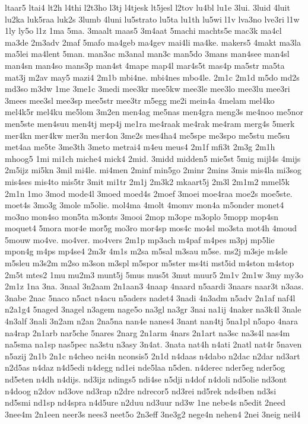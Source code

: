 {ltaar5
ltai4
lt2h
l4thi
l2t3ho
l3tj
l4tjesk
lt5jesl
l2tov
lu4bl
lu1e
3lui.
3luid
4luit
lu2ka
luk5raa
luk2s
3lumb
4luni
lu5strato
lu5ta
lu1th
lu5wi
l1v
lva3no
lve3ri
l1w
1ly
ly5o
l1z
1ma
5ma.
3maalt
maas5
3m4aat
5machi
machts5e
mac3k
ma4cl
ma3de
2m3adv
2maf
5mafo
ma4geb
ma4gev
mai4li
ma4ke.
makers5
4makt
ma3la
ma5lei
ma4lent
5man.
man3ac
m3anal
man3c
man5do
3mans
man4see
man4sl
man4sn
man4so
mans3p
man4st
4mape
map4l
mar4s5t
mas4p
ma5str
ma5ta
mat3j
m2av
may5
mazi4
2m1b
mbi4ne.
mbi4nes
mbo4le.
2m1c
2m1d
m5do
md2s
md3so
m3dw
1me
3me1c
3medi
mee3kr
mee5kw
mee3le
mee3lo
mee3lu
mee3ri
3mees
mee3sl
mee3sp
mee5str
mee3tr
m5egg
me2i
mein4a
4melam
mel4ko
mel4k5r
mel4ku
me5lom
3m2en
men4ag
me5nas
men4gra
meng3s
me4noo
me5nor
men5ste
men4suu
men4tj
mep4j
me1ra
me4raak
me4rak
me4ram
merg4s
5merk
mer4kn
mer4kw
mer3n
mer4on
3me2s
mes4ha4
me5spe
me3spo
me5stu
me5su
met4aa
me5te
3me3th
3meto
metrai4
m4eu
meus4
2m1f
mfi3t
2m3g
2m1h
mhoog5
1mi
mi1ch
miche4
mick4
2mid.
3midd
midden5
mie5st
5mig
mijl4s
4mijs
2m5ijz
mi5kn
3mil
mi4le.
mi4men
2minf
min5go
2minr
2mins
3mis
mis4la
mi3sog
mis4ses
mis4to
mis5tr
3mit
mi1tr
2m1j
2m3k2
mkaart5j
2m3l
2m1m2
mmel5k
2m1n
1mo
3mod
mode4l
3moed
moed4s
2moef
3moei
moe4raa
moe2s
moe5ste.
moet4s
3mo3g
3mole
m5olie.
mol4ma
4molt
4momv
mon4a
m5onder
monet4
mo3no
mon4so
mon5ta
m3onts
3mooi
2mop
m3ope
m3oplo
5mopp
mop4sn
moquet4
5mora
mor4e
mor5g
mo3ro
mor4sp
mos4c
mo4sl
mo3sta
mot4h
4moud
5mouw
mo4ve.
mo4ver.
mo4vers
2m1p
mp3ach
m4paf
m4pes
m3pj
mp5lie
mpon4g
m4ps
mp4se4
2m3r
4m1s
m2sa
m5sal
m3sau
m5se.
ms2j
m3sje
m4sle
m5sleu
m3s2m
m2so
m3son
m3spl
m5spor
m5ster
ms4ti
mst5id
m4ston
m4stop
2m5t
mtes2
1mu
mu2m3
munt5j
5mus
mus5t
3mut
muur5
2m1v
2m1w
3my
my3o
2m1z
1na
3na.
3naal
3n2aam
2n1aan3
4naap
4naard
n5aardi
3naars
naar3t
n3aas.
3nabe
2nac
5naco
n5act
n4acu
n5aders
nadet4
3nadi
4n3adm
n5adv
2n1af
naf4l
n2a1g4
5naged
3nagel
n3agem
nage5o
na3gl
na3gr
3nai
na1ij
4naker
na3k4l
3nale
4n3alf
3nali
3n2am
n2an
2na5na
nan4e
nanes4
3nant
nan4tj
5na1pl
n5apo
4nara
na4rap
2n1arb
nar5che
5nares
2narg
2n1arm
4nars
2n1art
na3sc
na3s4l
nas4m
na5sma
na1sp
nas5pec
na3stu
n3asy
3n4at.
3nata
nat4h
n4ati
2natl
nat4r
5naven
n5azij
2n1b
2n1c
n4cheo
nci4n
nconsis5
2n1d
n4daas
n4dabo
n2dac
n2dar
nd3art
n2d5as
n4daz
n4d5edi
n4degg
nd1ei
nde5laa
n5den.
n4derec
nder5eg
nder5og
nd5eten
n4dh
n4dijs.
nd3ijz
ndings5
ndi4se
n5dji
n4dof
n4doli
nd5olie
nd3ont
n4doog
n2dov
nd3ove
nd3rap
n2dre
ndrecor5
nd3rei
nd5rek
nds4ben
nd3si
nd5smi
nd1sp
nd4spra
n4d5ure
n2duu
nd3uur
nd3w
1ne
nebe4s
n5edit
2need
3nee4m
2n1een
neer3s
nees3
neet5o
2n3eff
3ne3g2
nege4n
nehen4
2nei
3neig
neil4
}
